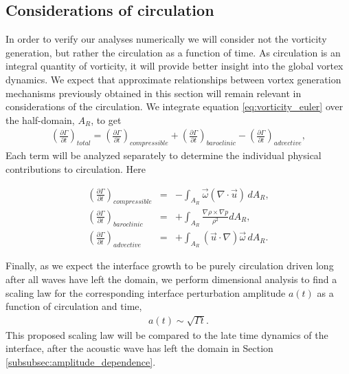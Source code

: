 \subsection{Considerations of circulation}
In order to verify our analyses numerically we will consider not the
vorticity generation, but rather the circulation as a function of
time. As circulation is an integral quantity of vorticity, it will
provide better insight into the global vortex dynamics. We expect that
approximate relationships between vortex generation mechanisms
previously obtained in this section will remain relevant in
considerations of the circulation. We integrate equation
\eqref{eq:vorticity_euler} over the half-domain, $A_R$, to get
%
\begin{align} \label{eq:circulation_generation}
  \left(\frac{\partial \Gamma}{\partial t}\right)_{total} =%
  \left(\frac{\partial \Gamma}{\partial t}\right)_{compressible} + \left(\frac{\partial \Gamma}{\partial t}\right)_{baroclinic} - \left(\frac{\partial \Gamma}{\partial t}\right)_{advective},
\end{align}
%
Each term will be analyzed separately to determine the individual
physical contributions to circulation. Here
%
\addtocounter{equation}{-1}
\begin{subequations}\label{eq:circulation_generation_components}%
  \begin{align}%
    &\left(\frac{\partial \Gamma}{\partial t}\right)_{compressible} &=& -\int_{A_R} \vec{\omega}\left(\nabla\cdot\vec{u}\right) \, dA_R,&\\
    &\left(\frac{\partial \Gamma}{\partial t}\right)_{baroclinic} &=& +\int_{A_R} \frac{\nabla\rho\times\nabla p}{\rho^2} dA_R,&\\
    &\left(\frac{\partial \Gamma}{\partial t}\right)_{advective} &=& +\int_{A_R} \left(\vec{u}\cdot\nabla\right)\vec{\omega} \, dA_R.&
  \end{align}
\end{subequations}
%

Finally, as we expect the interface growth to be purely circulation
driven long after all waves have left the domain, we perform
dimensional analysis to find a scaling law for the corresponding
interface perturbation amplitude $a(t)$ as a function of circulation
and time,
%
\begin{align} \label{eq:intf_circ_scaling}%
  a(t) \sim \sqrt{\Gamma t}.
\end{align}
%
This proposed scaling law will be compared to the late time dynamics
of the interface, after the acoustic wave has left the domain in
Section \ref{subsubsec:amplitude_dependence}.




